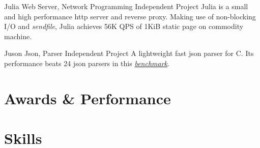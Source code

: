\documentclass[11pt,a4paper]{moderncv}
\begin{document}
{Julia}
{Web Server, Network Programming}
{Independent Project}{}{
	Julia is a small and high performance http server and reverse proxy. Making use of non-blocking I/O and \textit{sendfile}, Julia achieves 56K QPS of 1KiB static page on commodity machine.
}

{Juson}
{Json, Parser}
{Independent Project}{}{
	A lightweight fast json parser for C. Its performance beats 24 json parsers in this \href{https://github.com/miloyip/nativejson-benchmark}{\textit{benchmark}}.
}




\section{Awards \& Performance}

\section{Skills}



\clearpage
\end{document}
